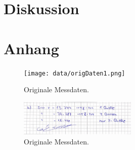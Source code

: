 \section{Diskussion}
\label{sec:Diskussion}


\printbibliography{}

\section*{Anhang}
\label{sec:anhang}

\begin{figure}[H]
    \centering
    \texttt{[image: data/origDaten1.png]}
    \caption{Originale Messdaten.}
    \label{fig:origDaten1}
\end{figure}

\begin{figure}[H]
    \centering
    \includegraphics[width=0.5\textwidth]{data/origDaten2.png}
    \caption{Originale Messdaten.}
    \label{fig:origDaten2}
\end{figure}